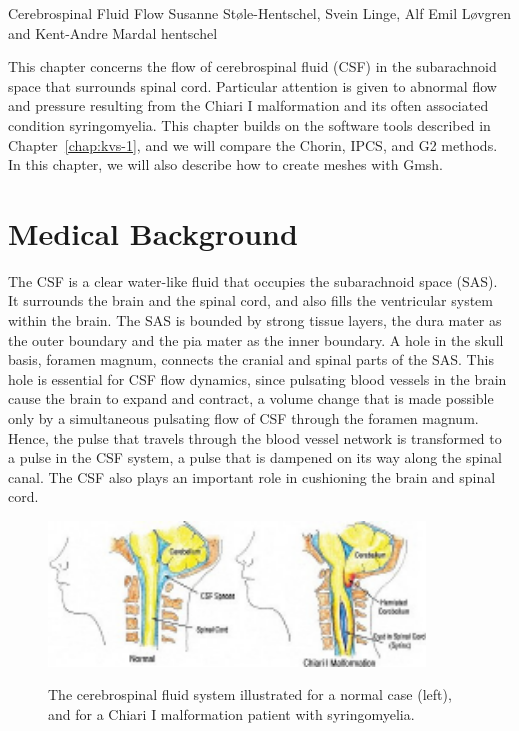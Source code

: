               {Cerebrospinal Fluid Flow}
              {Susanne St\o le-Hentschel, Svein Linge, Alf Emil L{\o}vgren and Kent-Andre Mardal}
              {hentschel}


This chapter concerns the flow of cerebrospinal fluid (CSF) in the subarachnoid space that 
surrounds spinal cord. Particular attention is given to abnormal flow and pressure resulting from 
the Chiari I malformation and its often associated condition syringomyelia. 
This chapter builds on the software tools described in Chapter~\ref{chap:kvs-1}, and
we will compare the Chorin, IPCS, and G2 methods. 
In this chapter, we will also describe how to create meshes with Gmsh.  





\section{Medical Background}

The CSF is a clear water-like fluid that occupies the subarachnoid space (SAS).
It surrounds the brain and the spinal cord, and also fills the ventricular
system within the brain. The SAS is bounded by strong tissue layers, the dura
mater as the outer boundary and the pia mater as the inner boundary. A hole in
the skull basis, foramen magnum, connects the cranial
and spinal parts of the SAS. This hole is essential for CSF flow dynamics,
since pulsating blood vessels in the brain cause the brain to expand and
contract, a volume change that is made possible only by a simultaneous
pulsating flow of CSF through the foramen magnum. Hence, the pulse that travels
through the blood vessel network is transformed to a pulse in the CSF system, a
pulse that is dampened on its way along the spinal canal. The CSF also plays an
important role in cushioning the brain and spinal cord.

\begin{figure}\begin{center}
\includegraphics[width=100mm]{chapters/hentschel/pdf/chiara_about.pdf}
\caption{The cerebrospinal fluid system illustrated for a normal case (left), 
    and for a Chiari I malformation patient with syringomyelia.}
\label{fig:anatomy}
\end{center}\end{figure}

